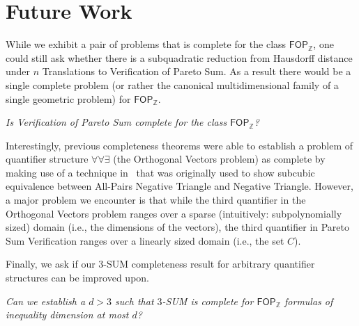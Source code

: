 \section{Future Work}\label{sec::ende}
While we exhibit a pair of problems that is complete for the class $\mathsf{FOP}_{\mathbb{Z}}$,
one could still ask whether there is a subquadratic reduction from Hausdorff distance under $n$ Translations to Verification of Pareto Sum.
As a result there would be a single complete problem (or rather the canonical multidimensional family of a single geometric problem) for $\mathsf{FOP}_{\mathbb{Z}}$.
\begin{center}
    \emph{ Is Verification of Pareto Sum complete for the class $\mathsf{FOP}_{\mathbb{Z}}$?}
    \end{center}


Interestingly, previous completeness theorems \cite{GaoIKW19} were able to establish a problem of quantifier structure $\forall \forall \exists$ (the Orthogonal Vectors problem) as complete
by making use of a technique in~\cite{DBLP:conf/focs/WilliamsW10} that was originally used to show subcubic equivalence
between All-Pairs Negative Triangle and Negative Triangle.
However, a major problem we encounter is that while the third quantifier in the Orthogonal Vectors problem ranges over a sparse (intuitively: subpolynomially sized) domain (i.e., the dimensions of the vectors),
the third quantifier in Pareto Sum Verification ranges over a linearly sized domain (i.e., the set $C$).

Finally, we ask if our $3$-SUM completeness result for arbitrary quantifier structures can be  improved upon.
\begin{center}
\emph{Can we establish a $d>3$ such that $3$-SUM is complete for 
$\mathsf{FOP}_{\mathbb{Z}}$ formulas of inequality dimension at most $d$?}
\end{center}
